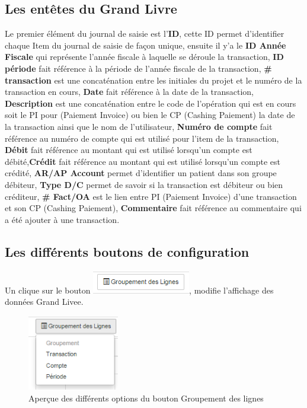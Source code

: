 \documentclass[12pt,a4paper]{report}
\begin{document}
\subsection{Les entêtes du Grand Livre}
Le premier élément du journal de saisie est l'\textbf{ID}, cette ID permet d'identifier chaque Item du journal de saisie de façon unique, ensuite il y'a le \textbf{ID Année Fiscale} qui représente l'année fiscale à laquelle se déroule la transaction,  \textbf{ID période} fait référence à la période de l'année fiscale de la transaction, \textbf{\# transaction} est une concaténation entre les initiales du projet et le numéro de la transaction en cours, \textbf{Date} fait référence à la date de la transaction, \textbf{Description} est une concaténation entre le code de l'opération qui est en cours soit le PI pour (Paiement Invoice) ou bien le CP (Cashing Paiement) la date de la transaction ainsi que le nom de l'utilisateur, \textbf{Numéro de compte} fait référence au numéro de compte qui est utilisé pour l'item de la transaction, \textbf{Débit} fait référence au montant qui est utilisé lorsqu'un compte est débité,\textbf{Crédit} fait référence au montant qui est utilisé lorsqu'un compte est crédité, \textbf{AR/AP Account} permet d'identifier un patient dans son groupe débiteur, \textbf{Type D/C }permet de savoir si la transaction est débiteur ou bien créditeur, \textbf{\# Fact/OA }est le lien entre PI (Paiement Invoice) d'une transaction et son CP (Cashing Paiement), \textbf{Commentaire} fait référence au commentaire qui a été ajouter à une transaction.

\subsection{Les différents boutons de configuration}

Un clique sur le bouton 
\includegraphics[scale=0.7]{pic/GroupeLignes.png}, modifie l'affichage des données Grand Livee.

\begin{figure}[h]
\begin{center}
\includegraphics[width=4cm]{pic/GrLigneAction.png}
\end{center}
\caption{Aperçue des différents options du bouton Groupement des lignes}
\label{Aperçue des différents options du bouton Groupement des lignes}
\end{figure}
\end{document}
